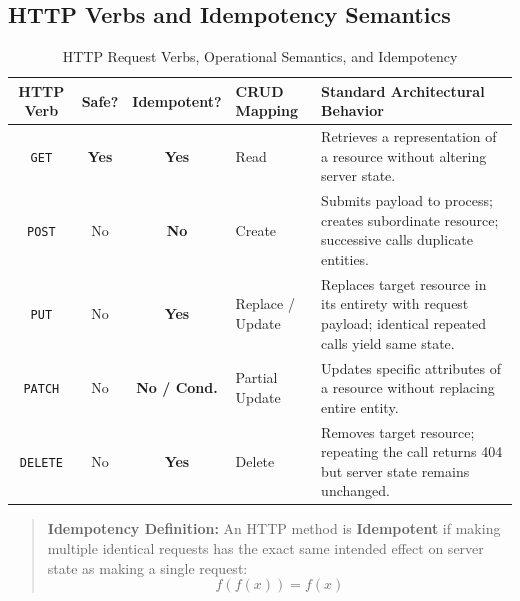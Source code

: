 \subsection{HTTP Verbs and Idempotency Semantics}
\begin{table}[htbp]
\centering
\small
\caption{HTTP Request Verbs, Operational Semantics, and Idempotency}
\label{tab:http_verbs}
\begin{tabularx}{\textwidth}{c c c p{4cm} X}
\toprule
\textbf{HTTP Verb} & \textbf{Safe?} & \textbf{Idempotent?} & \textbf{CRUD Mapping} & \textbf{Standard Architectural Behavior} \\
\midrule
\texttt{GET} & \textbf{Yes} & \textbf{Yes} & Read & Retrieves a representation of a resource without altering server state. \\
\texttt{POST} & No & \textbf{No} & Create & Submits payload to process; creates subordinate resource; successive calls duplicate entities. \\
\texttt{PUT} & No & \textbf{Yes} & Replace / Update & Replaces target resource in its entirety with request payload; identical repeated calls yield same state. \\
\texttt{PATCH} & No & \textbf{No / Cond.} & Partial Update & Updates specific attributes of a resource without replacing entire entity. \\
\texttt{DELETE} & No & \textbf{Yes} & Delete & Removes target resource; repeating the call returns 404 but server state remains unchanged. \\
\bottomrule
\end{tabularx}
\end{table}

\begin{quote}
\textbf{Idempotency Definition:} An HTTP method is \textbf{Idempotent} if making multiple identical requests has the exact same intended effect on server state as making a single request:
\begin{equation}
f(f(x)) = f(x)
\end{equation}
\end{quote}

